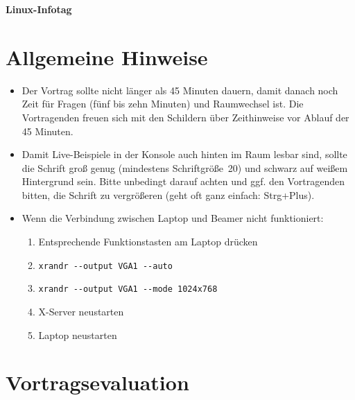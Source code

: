 \documentclass[a4paper,ngerman,14pt]{scrartcl}
\begin{document}
\begin{center}
  \Huge\sffamily
  {\textbf{Linux-Infotag}}
\end{center}

\section*{Allgemeine Hinweise}

\begin{itemize}
  \item Der Vortrag sollte nicht länger als 45 Minuten dauern,
  damit danach noch Zeit für Fragen (fünf bis zehn Minuten) und Raumwechsel ist.
  Die Vortragenden freuen sich mit den Schildern über Zeithinweise
  vor Ablauf der 45 Minuten.

  \item Damit Live-Beispiele in der Konsole auch hinten im Raum lesbar sind,
  sollte die Schrift groß genug (mindestens Schriftgröße~20) und schwarz auf
  weißem Hintergrund sein. Bitte unbedingt darauf achten und ggf. den
  Vortragenden bitten, die Schrift zu vergrößeren (geht oft ganz einfach:
  Strg+Plus).

  \item Wenn die Verbindung zwischen Laptop und Beamer nicht funktioniert:
  \begin{enumerate}
    \item Entsprechende Funktionstasten am Laptop drücken
    \item \texttt{xrandr -{}-output VGA1 -{}-auto}
    \item \texttt{xrandr -{}-output VGA1 -{}-mode 1024x768}
    \item X-Server neustarten
    \item Laptop neustarten
  \end{enumerate}
\end{itemize}


\section*{Vortragsevaluation}

\newcommand{\longline}{\underline{\hspace{12cm}}}
\newcommand{\shortline}{\underline{\hspace{3cm}}}

\newcommand{\checkbox}{$\ \Box\ $}
\newcommand{\boxes}{%
  \checkbox \> \checkbox \> \checkbox \> \checkbox \> \checkbox}

\onehalfspacing
\end{document}
